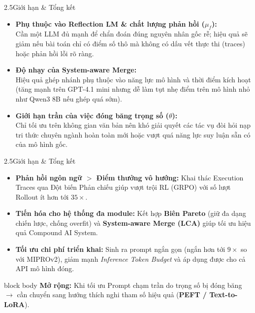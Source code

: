 \begin{frame}{2.5\quad Giới hạn \& Tổng kết}
  \begin{itemize}\setlength{\itemsep}{0.6em}
    \item \textbf{Phụ thuộc vào Reflection LM \& chất lượng phản hồi ($\mu_f$):}\\
          Cần một LLM đủ mạnh để chẩn đoán đúng nguyên nhân gốc rễ; hiệu quả sẽ giảm nếu
          bài toán chỉ có điểm số thô mà không có dấu vết thực thi (traces) hoặc phản hồi
          lỗi rõ ràng.
    \item \textbf{Độ nhạy của System-aware Merge:}\\
          Hiệu quả ghép nhánh phụ thuộc vào năng lực mô hình và thời điểm kích hoạt (tăng
          mạnh trên GPT-4.1 mini nhưng dễ làm tụt nhẹ điểm trên mô hình nhỏ như Qwen3 8B
          nếu ghép quá sớm).
    \item \textbf{Giới hạn trần của việc đóng băng trọng số ($\theta$):}\\
          Chỉ tối ưu trên không gian văn bản nên khó giải quyết các tác vụ đòi hỏi nạp tri
          thức chuyên ngành hoàn toàn mới hoặc vượt quá năng lực suy luận sẵn có của mô hình
          gốc.
  \end{itemize}
\end{frame}

\begin{frame}{2.5\quad Giới hạn \& Tổng kết}
  \begin{itemize}\setlength{\itemsep}{0.55em}
    \item \textbf{Phản hồi ngôn ngữ $>$ Điểm thưởng vô hướng:} Khai thác Execution Traces
          qua Đột biến Phản chiếu giúp vượt trội RL (GRPO) với số lượt Rollout ít hơn tới
          \textbf{$35\times$}.
    \item \textbf{Tiến hóa cho hệ thống đa module:} Kết hợp \textbf{Biên Pareto} (giữ đa
          dạng chiến lược, chống overfit) và \textbf{System-aware Merge (LCA)} giúp tối ưu
          hiệu quả Compound AI System.
    \item \textbf{Tối ưu chi phí triển khai:} Sinh ra prompt ngắn gọn (ngắn hơn tới
          \textbf{$9\times$} so với MIPROv2), giảm mạnh \textit{Inference Token Budget} và
          áp dụng được cho cả API mô hình đóng.
  \end{itemize}
  \vspace{0.35em}
  \begin{beamercolorbox}[wd=\linewidth,sep=0.55em]{block body}
    \textbf{Mở rộng:} Khi tối ưu Prompt chạm trần do trọng số bị đóng băng $\rightarrow$
    cần chuyển sang hướng thích nghi tham số hiệu quả (\textbf{PEFT / Text-to-LoRA}).
  \end{beamercolorbox}
\end{frame}